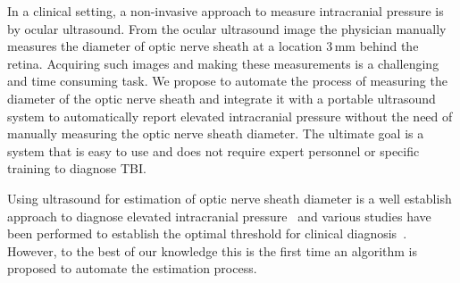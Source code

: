 \documentclass{llncs}
\begin{document}
In a clinical setting, a non-invasive approach to measure intracranial pressure is
by ocular ultrasound. From the ocular ultrasound image the physician manually
measures the diameter of optic nerve sheath at a location 3\,mm behind the retina.
Acquiring such images and making these measurements is a challenging and time
consuming task. We propose to automate the process of measuring the diameter of
the optic nerve sheath and integrate it with a portable ultrasound system to
automatically report elevated intracranial pressure without the need of
manually measuring the optic nerve sheath diameter. The ultimate goal is a
system that is easy to use and does not require expert personnel or specific
training to diagnose TBI.    

Using ultrasound for estimation of optic nerve sheath diameter is a well
establish approach to diagnose elevated intracranial
pressure~\cite{Ki2008,Ro2011} and various studies have been performed to
establish the optimal threshold for clinical
diagnosis~\cite{Mo2009,Du2011,Ra2011}. However, to the best of our knowledge
this is the first time an algorithm is proposed to automate the estimation
process.
\end{document}

